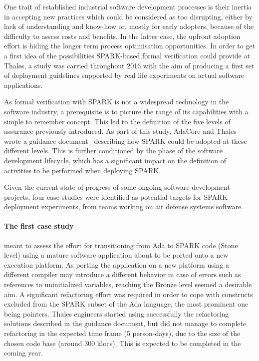 \documentclass{llncs}
\begin{document}
One trait of established industrial software development processes is their
inertia in accepting new practices which could be considered as too disrupting,
either by lack of understanding and know-how or, mostly for early adopters,
because of the difficulty to assess costs and benefits. In the latter case, the
upfront adoption effort is hiding the longer term process optimisation
opportunities. In order to get a first idea of the possibilities SPARK-based
formal verification could provide at Thales, a study was carried throughout
2016 with the aim of producing a first set of deployment guidelines supported
by real life experiments on actual software applications.

As formal verification with SPARK is not a widespread technology in the
software industry, a prerequisite is to picture the range of its capabilities
with a simple to remember concept. This led to the definition of the five
levels of assurance previously introduced. As part of this study, AdaCore and
Thales wrote a guidance document~\cite{AdaCoreThalesSPARK} describing how SPARK
could be adopted at these different levels. This is further conditioned by the
phase of the software development lifecycle, which has a significant impact on
the definition of activities to be performed when deploying SPARK.

Given the current state of progress of some ongoing software development
projects, four case studies were identified as potential targets for SPARK
deployment experiments, from teams working on air defense systems software.

\paragraph{The first case study} meant to assess the effort for transitioning from Ada to
SPARK code (Stone level) using a mature software application about to be ported
onto a new execution platform. As porting the application on a new platform
using a different compiler may introduce a different behavior in case of errors
such as references to uninitialized variables, reaching the Bronze level seemed
a desirable aim. A significant refactoring effort was required in order to cope
with constructs excluded from the SPARK subset of the Ada language, the most
prominent one being pointers. Thales engineers started using successfully the
refactoring solutions described in the guidance document, but did not manage to
complete refactoring in the expected time frame (5 person-days), due to the
size of the chosen code base (around 300 klocs). This is expected to be
completed in the coming year.
\end{document}
